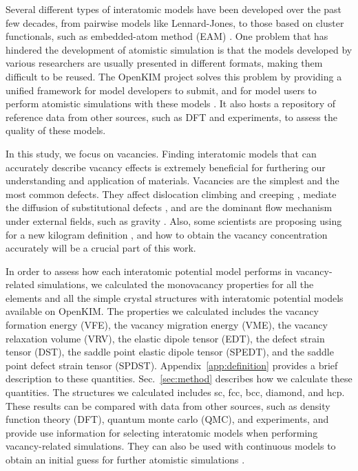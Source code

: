 \documentclass[%
 reprint,
 amsmath,amssymb,
 aps,
]{revtex4-1}
\begin{document}
Several different types of interatomic models have been developed over the past few decades, from pairwise models like Lennard-Jones, to those based on cluster functionals, such as embedded-atom method (EAM) \cite{daw1993embedded, daw1984embedded}.
One problem that has hindered the development of atomistic simulation is that the models developed by various researchers are usually presented in different formats, making them difficult to be reused.
The OpenKIM project \cite{bierbaum2014openkim, openkim2016} solves this problem by providing a unified framework for model developers to submit, and for model users to perform atomistic simulations with these models \cite{tadmor2011potential}.
It also hosts a repository of reference data from other sources, such as DFT and experiments, to assess the quality of these models.

In this study, we focus on vacancies.
Finding interatomic models that can accurately describe vacancy effects is extremely beneficial for furthering our understanding and application of materials.
Vacancies are the simplest and the most common defects.
They affect dislocation climbing and creeping \cite{weertman1955theory}, mediate the diffusion of substitutional defects \cite{fahey1989point}, and are the dominant flow mechanism under external fields, such as gravity \cite{sethna2014flow}.
Also, some scientists are proposing using  for a new kilogram definition \cite{andreas2011counting}, and how to obtain the vacancy concentration accurately will be a crucial part of this work.

In order to assess how each interatomic potential model performs in vacancy-related simulations, we calculated the monovacancy properties for all the elements and all the simple crystal structures with interatomic potential models available on OpenKIM.
The properties we calculated includes the vacancy formation energy (VFE), the vacancy migration energy (VME), the vacancy relaxation volume (VRV), the elastic dipole tensor (EDT), the defect strain tensor (DST), the saddle point elastic dipole tensor (SPEDT), and the saddle point defect strain tensor (SPDST).
Appendix~\ref{app:definition} provides a brief description to these quantities.
Sec.~\ref{sec:method} describes how we calculate these quantities.
The structures we calculated includes sc, fcc, bcc, diamond, and hcp.
These results can be compared with data from other sources, such as density function theory (DFT), quantum monte carlo (QMC), and experiments, and provide use information for selecting interatomic models when performing vacancy-related simulations.
They can also be used with continuous models to obtain an initial guess for further atomistic simulations \cite{bozhevolnyi2001multiple}.
\end{document}
